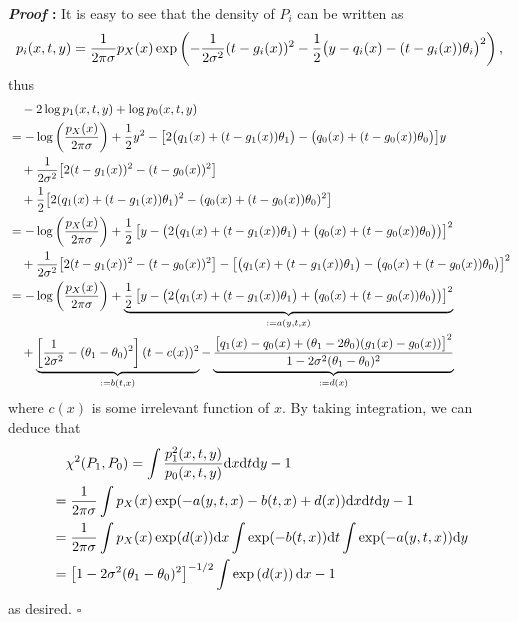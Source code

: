 \documentclass{article}
\newcommand{\dd}{\textup{d}}
\renewenvironment{proof}{\noindent\textbf{\textit{Proof }:}}{\hfill$\square$}
\begin{document}
\begin{proof}
    It is easy to see that the density of $P_i$ can be written as
    \begin{equation}
        \notag
        p_i(x,t,y) = \frac{1}{2\pi\sigma}p_X(x)\exp\left(-\frac{1}{2\sigma^2}(t-g_i(x))^2 - \frac{1}{2}\big(y-q_i(x)-(t-g_i(x))\theta_i\big)^2\right),
    \end{equation}
    thus
    \begin{equation}
        \notag
        \begin{aligned}
            &\quad -2\log p_1(x,t,y) + \log p_0(x,t,y) \\
            &= -\log\left(\frac{p_X(x)}{2\pi\sigma}\right) + \frac{1}{2}y^2 - \big[ 2\big(q_1(x)+(t-g_1(x))\theta_1\big) - \big(q_0(x)+(t-g_0(x))\theta_0\big) \big] y \\
            &\quad + \frac{1}{2\sigma^2}\big[2(t-g_1(x))^2-(t-g_0(x))^2\big] \\
            &\quad + \frac{1}{2}\big[2(q_1(x)+(t-g_1(x))\theta_1)^2-(q_0(x)+(t-g_0(x))\theta_0)^2\big]\\
            &= -\log\left(\frac{p_X(x)}{2\pi\sigma}\right) + \frac{1}{2}\left[ y - \big( 2\big(q_1(x)+(t-g_1(x))\theta_1\big) + \big(q_0(x)+(t-g_0(x))\theta_0\big) \big) \right]^2 \\
            &\quad + \frac{1}{2\sigma^2}\big[2(t-g_1(x))^2-(t-g_0(x))^2\big] - \big[ \big(q_1(x)+(t-g_1(x))\theta_1\big) - \big(q_0(x)+(t-g_0(x))\theta_0\big) \big]^2\\
            &= -\log\left(\frac{p_X(x)}{2\pi\sigma}\right) + \underbrace{\frac{1}{2}\left[ y - \big( 2\big(q_1(x)+(t-g_1(x))\theta_1\big) + \big(q_0(x)+(t-g_0(x))\theta_0\big) \big) \right]^2}_{:= a(y,t,x)} \\
            &\quad + \underbrace{\left[\frac{1}{2\sigma^2}-(\theta_1-\theta_0)^2\right] (t - c(x))^2}_{:= b(t,x)} -  \underbrace{\frac{\big[q_1(x)-q_0(x)+(\theta_1-2\theta_0)(g_1(x)-g_0(x)) \big]^2}{1-2\sigma^2(\theta_1-\theta_0)^2}}_{:=d(x)}\\
        \end{aligned}
    \end{equation}
where $c(x)$ is some irrelevant function of $x$. By taking integration, we can deduce that
\begin{equation}
    \notag
    \begin{aligned}
        &\quad \chi^2(P_1,P_0) = \int \frac{p_1^2(x,t,y)}{p_0(x,t,y)} \dd x \dd t \dd y - 1 \\
        &= \frac{1}{2\pi\sigma}\int  p_X(x) \exp(-a(y,t,x)-b(t,x) + d(x)) \dd x\dd t \dd y -1 \\
        &= \frac{1}{2\pi\sigma}\int p_X(x) \exp(d(x))\dd x \int \exp(-b(t,x))\dd t \int \exp(-a(y,t,x))\dd y \\
        &= \big[1-2\sigma^2(\theta_1-\theta_0)^2\big]^{-1/2} \int \exp\left(d(x)\right) \dd x - 1
    \end{aligned}
\end{equation}
as desired.
\end{proof}
\end{document}
